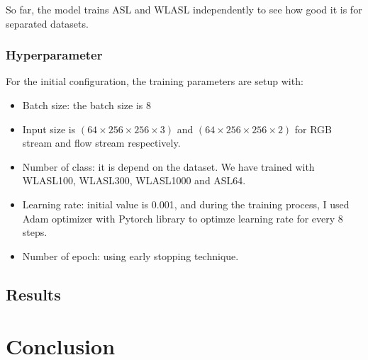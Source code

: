 \documentclass[a4paper, 12pt]{article}
\begin{document}
So far, the model trains ASL and WLASL independently to see how good it is for separated datasets.

\subsubsection{Hyperparameter}
For the initial configuration, the training parameters are setup with:

\begin{itemize}
    \item Batch size: the batch size is 8
    \item Input size is $(64 \times 256 \times 256 \times 3)$ and $(64 \times 256 \times 256 \times 2)$ for RGB stream and flow stream respectively.
    \item Number of class: it is depend on the dataset. We have trained with WLASL100, WLASL300, WLASL1000 and ASL64.
    \item Learning rate: initial value is 0.001, and during the training process, I used Adam optimizer with Pytorch library to optimze learning rate for every 8 steps.
    \item Number of epoch: using early stopping technique.
\end{itemize}

\subsection{Results}

\section{Conclusion}


\newpage

\newpage


\end{document}
